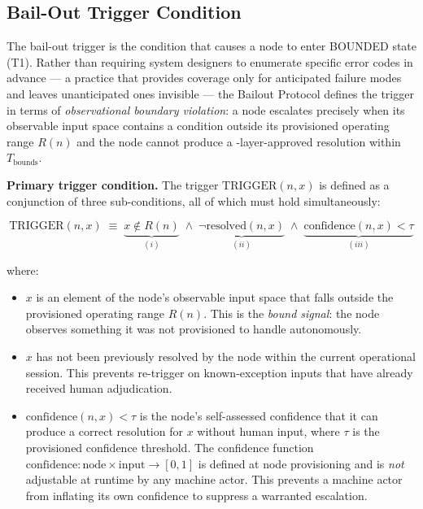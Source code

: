 \subsection{Bail-Out Trigger Condition}\label{sec:bailout-trigger}

The bail-out trigger is the condition that causes a node to enter BOUNDED state (T1). Rather than requiring system designers to enumerate specific error codes in advance — a practice that provides coverage only for anticipated failure modes and leaves unanticipated ones invisible — the Bailout Protocol defines the trigger in terms of \emph{observational boundary violation}: a node escalates precisely when its observable input space contains a condition outside its provisioned operating range $R(n)$ and the node cannot produce a \fact-layer-approved resolution within $T_{\text{bounds}}$.

\bigskip
\noindent\textbf{Primary trigger condition.} The trigger $\text{TRIGGER}(n, x)$ is defined as a conjunction of three sub-conditions, all of which must hold simultaneously:

\begin{equation}
\text{TRIGGER}(n, x) \;\equiv\; \underbrace{x \notin R(n)}_{(i)} \;\land\; \underbrace{\neg\text{resolved}(n, x)}_{(ii)} \;\land\; \underbrace{\text{confidence}(n, x) < \tau}_{(iii)} \tag{TC}
\end{equation}

where:

\begin{itemize}\itemsep=0pt
\item[(i)] $x$ is an element of the node's observable input space that falls outside the provisioned operating range $R(n)$. This is the \emph{bound signal}: the node observes something it was not provisioned to handle autonomously.

\item[(ii)] $x$ has not been previously resolved by the node within the current operational session. This prevents re-trigger on known-exception inputs that have already received human adjudication.

\item[(iii)] $\text{confidence}(n, x) < \tau$ is the node's self-assessed confidence that it can produce a correct resolution for $x$ without human input, where $\tau$ is the provisioned confidence threshold. The confidence function $\text{confidence} : \text{node} \times \text{input} \rightarrow [0, 1]$ is defined at node provisioning and is \emph{not} adjustable at runtime by any machine actor. This prevents a machine actor from inflating its own confidence to suppress a warranted escalation.
\end{itemize}


